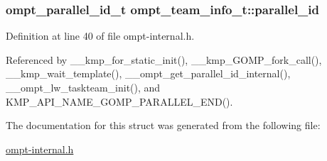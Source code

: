 \hypertarget{structompt__team__info__t_aea8969d8ca37577c35b466c675a7a241}{
\subsubsection[{parallel\-\_\-id}]{\setlength{\rightskip}{0pt plus 5cm}ompt\-\_\-parallel\-\_\-id\-\_\-t ompt\-\_\-team\-\_\-info\-\_\-t\-::parallel\-\_\-id}}\label{structompt__team__info__t_aea8969d8ca37577c35b466c675a7a241}


Definition at line 40 of file ompt-\/internal.\-h.



Referenced by \-\_\-\-\_\-kmp\-\_\-for\-\_\-static\-\_\-init(), \-\_\-\-\_\-kmp\-\_\-\-G\-O\-M\-P\-\_\-fork\-\_\-call(), \-\_\-\-\_\-kmp\-\_\-wait\-\_\-template(), \-\_\-\-\_\-ompt\-\_\-get\-\_\-parallel\-\_\-id\-\_\-internal(), \-\_\-\-\_\-ompt\-\_\-lw\-\_\-taskteam\-\_\-init(), and K\-M\-P\-\_\-\-A\-P\-I\-\_\-\-N\-A\-M\-E\-\_\-\-G\-O\-M\-P\-\_\-\-P\-A\-R\-A\-L\-L\-E\-L\-\_\-\-E\-N\-D().



The documentation for this struct was generated from the following file\-:\begin{DoxyCompactItemize}
\item 
\hyperlink{ompt-internal_8h}{ompt-\/internal.\-h}\end{DoxyCompactItemize}
